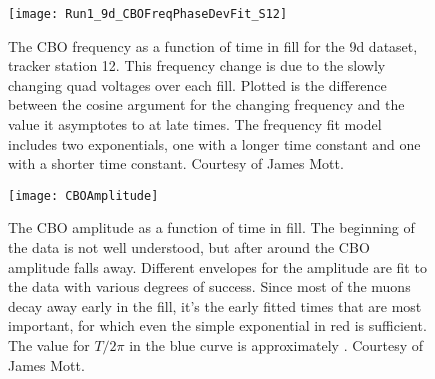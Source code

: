 \begin{figure}[]
    \centering
    \texttt{[image: Run1\_9d\_CBOFreqPhaseDevFit\_S12]}
    \caption[CBO frequency as a function of time]{The CBO frequency as a function of time in fill for the 9d dataset, tracker station 12. This frequency change is due to the slowly changing quad voltages over each fill. Plotted is the difference between the cosine argument for the changing frequency and the value it asymptotes to at late times. The frequency fit model includes two exponentials, one with a longer time constant and one with a shorter time constant. Courtesy of James Mott.}
    \label{fig:CBOFrequency}
\end{figure}



\begin{figure}[]
    \centering
    \texttt{[image: CBOAmplitude]}
    \caption[CBO amplitude as a function of time]{The CBO amplitude as a function of time in fill. The beginning of the data is not well understood, but after around  the CBO amplitude falls away. Different envelopes for the amplitude are fit to the data with various degrees of success. Since most of the muons decay away early in the fill, it's the early fitted times that are most important, for which even the simple exponential in red is sufficient. The value for $T/2\pi$ in the blue curve is approximately . Courtesy of James Mott.}
    \label{fig:CBOAmplitude}
\end{figure}







\cleardoublepage




